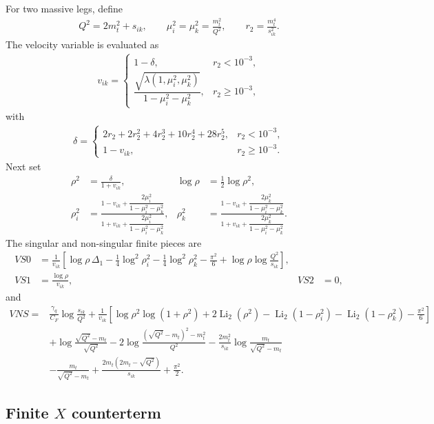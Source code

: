 \documentclass[11pt]{article}
\begin{document}
For two massive legs, define
\begin{align}
Q^2=2m_t^2+s_{ik},
\qquad
\mu_i^2=\mu_k^2=\frac{m_t^2}{Q^2},
\qquad
r_2=\frac{m_t^4}{s_{ik}^2}.
\end{align}
The velocity variable is evaluated as
\begin{align}
v_{ik}=
\begin{cases}
1-\delta,
& r_2<10^{-3},\\[0.4em]
\dfrac{\sqrt{\lambda(1,\mu_i^2,\mu_k^2)}}{1-\mu_i^2-\mu_k^2},
& r_2\ge 10^{-3},
\end{cases}
\end{align}
with
\begin{align}
\delta=
\begin{cases}
2r_2+2r_2^2+4r_2^3+10r_2^4+28r_2^5,
& r_2<10^{-3},\\
1-v_{ik}, & r_2\ge 10^{-3}.
\end{cases}
\end{align}
Next set
\begin{align}
\rho^2 &= \frac{\delta}{1+v_{ik}},
&\log\rho &= \frac12\log\rho^2,\\
\rho_i^2 &=
\frac{1-v_{ik}+\dfrac{2\mu_i^2}{1-\mu_i^2-\mu_k^2}}
{1+v_{ik}+\dfrac{2\mu_i^2}{1-\mu_i^2-\mu_k^2}},
&
\rho_k^2 &=
\frac{1-v_{ik}+\dfrac{2\mu_k^2}{1-\mu_i^2-\mu_k^2}}
{1+v_{ik}+\dfrac{2\mu_k^2}{1-\mu_i^2-\mu_k^2}}.
\end{align}
The singular and non-singular finite pieces are
\begin{align}
VS0 &= \frac{1}{v_{ik}}
\left[
\log\rho\,\Delta_1
-\frac14\log^2\rho_i^2
-\frac14\log^2\rho_k^2
-\frac{\pi^2}{6}
+\log\rho\log\frac{Q^2}{s_{ik}}
\right],\\
VS1 &= \frac{\log\rho}{v_{ik}},
&VS2&=0,
\end{align}
and
\begin{align}
VNS ={}& \frac{\gamma_q}{C_F}\log\frac{s_{ik}}{Q^2}
+\frac{1}{v_{ik}}
\left[
\log\rho^2\log(1+\rho^2)
+2\operatorname{Li}_2(\rho^2)
-\operatorname{Li}_2(1-\rho_i^2)
-\operatorname{Li}_2(1-\rho_k^2)
-\frac{\pi^2}{6}
\right]\\
&+\log\frac{\sqrt{Q^2}-m_t}{\sqrt{Q^2}}
-2\log\frac{(\sqrt{Q^2}-m_t)^2-m_t^2}{Q^2}
-\frac{2m_t^2}{s_{ik}}\log\frac{m_t}{\sqrt{Q^2}-m_t}\\
&-\frac{m_t}{\sqrt{Q^2}-m_t}
+\frac{2m_t(2m_t-\sqrt{Q^2})}{s_{ik}}
+\frac{\pi^2}{2}.
\end{align}

\subsection{Finite \texorpdfstring{$X$}{X} counterterm}
\end{document}
